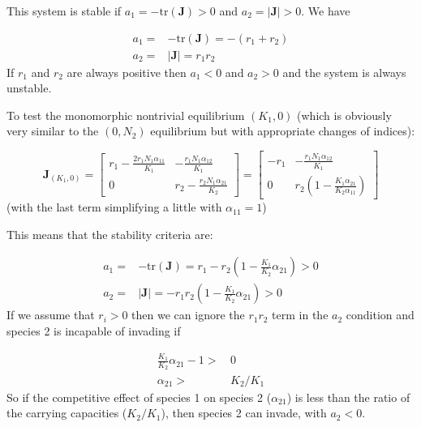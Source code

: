 \documentclass[12pt,a4paper]{article}
\newcommand{\tr}{\mathrm{tr}}
\begin{document}
This system is stable if $a_1 = -\tr(\mathbf{J}) > 0$ and $a_2 =
|\mathbf{J}| > 0$.  We have

\begin{equation*}
  \begin{split}
    a_1 =& -\tr(\mathbf{J}) = -(r_1 + r_2)\\
    a_2 =& |\mathbf{J}| = r_1 r_2
  \end{split}
\end{equation*}
%
If $r_1$ and $r_2$ are always positive then $a_1 < 0$ and $a_2 > 0$
and the system is always unstable.

To test the monomorphic nontrivial equilibrium $(K_1, 0)$ (which is
obviously very similar to the $(0, N_2)$ equilibrium but with
appropriate changes of indices):

\begin{equation}
  \label{eq:competitive-lv-jac-monomorphic}
  \mathbf{J}_{(K_1, 0)} =
  \begin{bmatrix}
    r_1 - \frac{2 r_1 N_1 \alpha_{11}}{K_1}&
    -\frac{r_1N_1\alpha_{12}}{K_1}\\
    0&
    r_2 - \frac{r_2N_1\alpha_{21}}{K_2}
  \end{bmatrix}
  =
  \begin{bmatrix}
    -r_1&
    -\frac{r_1N_1\alpha_{12}}{K_1}\\
    0&
    r_2\left(1  - \frac{K_1\alpha_{21}}{K_2\alpha_{11}}\right)
  \end{bmatrix}
\end{equation}
%
(with the last term simplifying a little with $\alpha_{11} = 1$)

This means that the stability criteria are:

\begin{equation*}
  \begin{split}
    a_1 =& -\tr(\mathbf{J}) = 
    r_1 - r_2\left(1  - \frac{K_1}{K_2}\alpha_{21}\right) > 0\\
    a_2 =& |\mathbf{J}| = 
    -r_1 r_2\left(1  - \frac{K_1}{K_2}\alpha_{21}\right) > 0
  \end{split}
\end{equation*}
%
If we assume that $r_i > 0$ then we can ignore the $r_1r_2$ term in
the $a_2$ condition and species 2 is incapable of invading if

\begin{equation*}
  \begin{split}
    \frac{K_1}{K_2}\alpha_{21} - 1 >&\, 0\\
    \alpha_{21} >&\, K_2 / K_1
  \end{split}
\end{equation*}
So if the competitive effect of species 1 on species 2 ($\alpha_{21}$)
is less than the ratio of the carrying capacities ($K_2/K_1$), then
species 2 can invade, with $a_2 < 0$.
\end{document}
